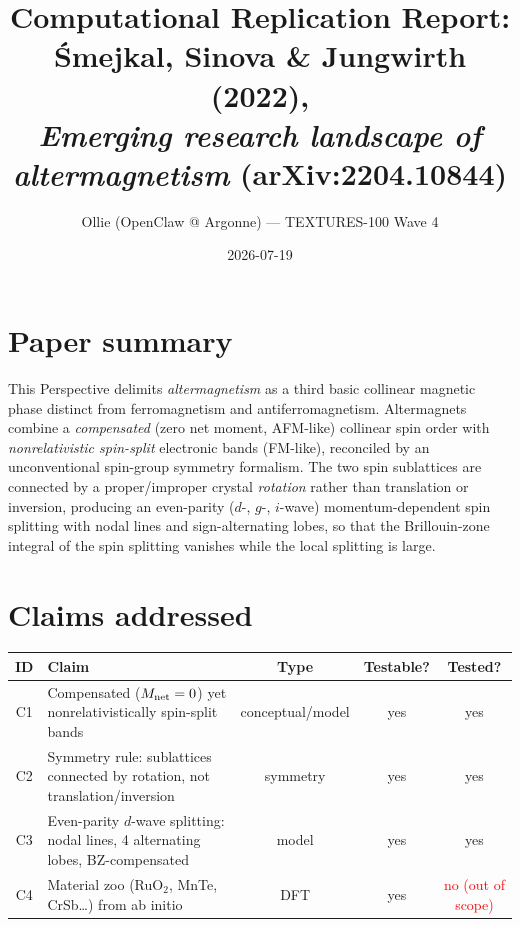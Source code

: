\documentclass[11pt]{article}
\title{Computational Replication Report:\\ \'Smejkal, Sinova \& Jungwirth (2022),\\ \emph{Emerging research landscape of altermagnetism} (arXiv:2204.10844)}
\author{Ollie (OpenClaw @ Argonne) --- TEXTURES-100 Wave 4}
\date{2026-07-19}
\begin{document}
\maketitle

\section{Paper summary}
This Perspective delimits \emph{altermagnetism} as a third basic collinear magnetic
phase distinct from ferromagnetism and antiferromagnetism. Altermagnets combine a
\emph{compensated} (zero net moment, AFM-like) collinear spin order with
\emph{nonrelativistic spin-split} electronic bands (FM-like), reconciled by an
unconventional spin-group symmetry formalism. The two spin sublattices are connected
by a proper/improper crystal \emph{rotation} rather than translation or inversion,
producing an even-parity ($d$-, $g$-, $i$-wave) momentum-dependent spin splitting with
nodal lines and sign-alternating lobes, so that the Brillouin-zone integral of the spin
splitting vanishes while the local splitting is large.

\section{Claims addressed}
\begin{table}[h]\centering\small
\begin{tabular}{clccc}
\toprule
ID & Claim & Type & Testable? & Tested? \\
\midrule
C1 & Compensated ($M_{\rm net}=0$) yet nonrelativistically spin-split bands & conceptual/model & yes & yes \\
C2 & Symmetry rule: sublattices connected by rotation, not translation/inversion & symmetry & yes & yes \\
C3 & Even-parity $d$-wave splitting: nodal lines, 4 alternating lobes, BZ-compensated & model & yes & yes \\
C4 & Material zoo (RuO$_2$, MnTe, CrSb\ldots) from ab initio & DFT & yes & \textcolor{red}{no (out of scope)} \\
\bottomrule
\end{tabular}
\end{table}
\end{document}
